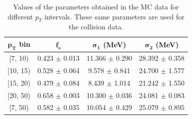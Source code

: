 \begin{table}[htp!]
	
	\begin{center}
		\begin{tabular}{|c|c|c|c|}
			\hline
			\textbf{$\mathbf{p_T}$ bin} & $\mathbf{f_s}$ & \textbf{$\mathbf{\sigma_1}$ (MeV)} & \textbf{$\mathbf{\sigma_2}$ (MeV)}\\ \hline
			[7, 10) & 0.423 $\pm$ 0.013 & 11.366 $\pm$ 0.290 &28.392 $\pm$ 0.358\\ \hline 
			[10, 15) & 0.528 $\pm$ 0.064 & 9.578 $\pm$ 0.841 &24.700 $\pm$ 1.577\\ \hline 
			[15, 20) & 0.479 $\pm$ 0.084 & 8.439 $\pm$ 1.014 &21.242 $\pm$ 1.550\\ \hline 
			[20, 50) & 0.658 $\pm$ 0.003 & 10.300 $\pm$ 0.036 &24.081 $\pm$ 0.083\\ \hline 
			[7, 50) & 0.582 $\pm$ 0.035 & 10.054 $\pm$ 0.429 &25.079 $\pm$ 0.895\\ \hline 
		\end{tabular}
	\end{center}
	\caption{Values of the parameters obtained in the MC data for different $p_T$ intervals. These same parameters are used for the collision data.}
	\label{table:mc_ptbins}
\end{table}

